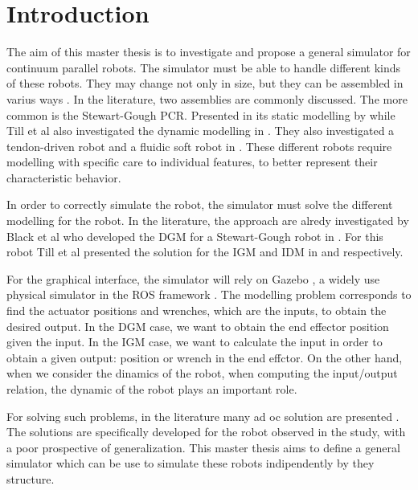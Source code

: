 \documentclass{thesisreport}
\begin{document}
 \chapter*{Introduction}
 The aim of this master thesis is to investigate and propose a general simulator for continuum parallel robots. The simulator must be able to handle different kinds of these robots. They may change not only in size, but they can be assembled in varius ways \cite{bryson_toward_2014}. In the literature, two assemblies are commonly discussed. The more common is the Stewart-Gough PCR. Presented in its static modelling by \cite{till_efficient_2015} \cite{black_parallel_2018} while Till et al also investigated the dynamic modelling in \cite{till_real-time_2019}. They also investigated a tendon-driven robot and a fluidic soft robot in \cite{till_real-time_2019}. These different robots require modelling with specific care to individual features, to better represent their characteristic behavior. 
 
 In order to correctly simulate the robot, the simulator must solve the different modelling for the robot. In the literature, the approach are alredy investigated by Black et al who developed the DGM for a Stewart-Gough robot in \cite{black_parallel_2018}. For this robot Till et al presented the solution for the IGM and IDM in \cite{till_real-time_2019} and \cite{till_efficient_2015} respectively.
 
 For the graphical interface, the simulator will rely on Gazebo \cite{koenig_design_2004}\cite{noauthor_gazebo_nodate}, a widely use physical simulator in the ROS framework \cite{noauthor_rosorg_nodate}. The modelling problem corresponds to find the actuator positions and wrenches, which are the inputs, to obtain the desired output. In the DGM case, we want to obtain the end effector position given the input. In the IGM case, we want to calculate the input in order to obtain a given output: position or wrench in the end effctor. On the other hand, when we consider the dinamics of the robot, when computing the input/output relation, the dynamic of the robot plays an important role. 
 
 For solving such problems, in the literature many ad oc solution are presented \cite{till_efficient_2015}\cite{black_parallel_2018}\cite{till_real-time_2019}. The solutions are specifically developed for the robot observed in the study, with a poor prospective of generalization. This master thesis aims to define a general simulator which can be use to simulate these robots indipendently by they structure. 
 
\end{document}
